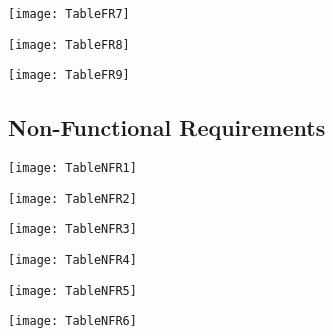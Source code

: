 \begin{center}

\centering
\texttt{[image: TableFR7]}
\end{center}

\begin{center}

\centering
\texttt{[image: TableFR8]}
\end{center}

\begin{center}

\centering
\texttt{[image: TableFR9]}
\end{center}


\subsection{Non-Functional Requirements} 

\begin{center}
\centering
\texttt{[image: TableNFR1]}
\end{center}

\begin{center}

\centering
\texttt{[image: TableNFR2]}
\end{center}

\begin{center}

\centering
\texttt{[image: TableNFR3]}
\end{center}

\begin{center}

\centering
\texttt{[image: TableNFR4]}
\end{center}

\begin{center}

\centering
\texttt{[image: TableNFR5]}
\end{center}

\begin{center}

\centering
\texttt{[image: TableNFR6]}
\end{center}

